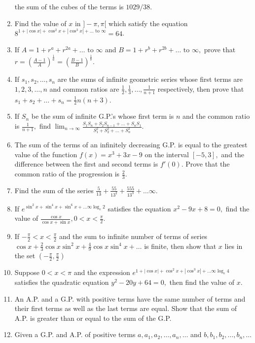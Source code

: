 \begin{enumerate}
  the sum of the cubes of the terms is $1029/38$.
\item Find the value of $x$ in $]-\pi, \pi[$ which satisfy the equation $8^{1 + |\cos x| + \cos^2 x + |\cos^3 x| + \ldots
      \text{~to~}\infty} = 64$.
\item If $A = 1 + r^a + r^{2a} + \ldots \text{~to~}\infty$ and $B = 1 + r^b + r^{2b} + \ldots \text{~to~}\infty,$ prove
  that $r = \left(\frac{A - 1}{A}\right)^{\frac{1}{a}} = \left(\frac{B - 1}{B}\right)^{\frac{1}{b}}$.
\item If $s_1, s_2, \ldots, s_n$ are the sums of infinite geometric series whose first terms are $1, 2, 3, \ldots, n$ and
  common ratios are $\frac{1}{2}, \frac{1}{3}, \ldots, \frac{1}{n + 1}$ respectively, then prove that $s_1 + s_2 + \ldots + s_n =
  \frac{1}{2}n(n + 3)$.
\item If $S_n$ be the sum of infinite G.P.'s whose first term is $n$ and the common ratio is $\frac{1}{n + 1},$ find
  $\displaystyle\lim_{n\to \infty} \frac{S_1S_n + S_2S_{n - 1} + \ldots + S_nS_1}{S_1^2 + S_2^2 + \ldots + S_n^2}$.
\item The sum of the terms of an infinitely decreasing G.P. is equal to the greatest value of the function $f(x) = x^3 +
  3x - 9$ on the interval $[-5, 3],$ and the difference between the first and second terms is $f'(0).$ Prove that the common ratio
  of the progression is $\frac{2}{3}$.
\item Find the sum of the series $\frac{5}{13} + \frac{55}{13^2} + \frac{555}{13^3} + \ldots \infty$.
\item If $e^{{\sin^2x + \sin^4x + \sin^6x + \ldots \infty}\log_e2}$ satisfies the equation $x^2 - 9x + 8 = 0,$ find the
  value of $\frac{\cos x}{\cos x + \sin x}, 0 < x < \frac{\pi}{2}$.
\item If $-\frac{\pi}{2} < x < \frac{\pi}{2}$ and the sum to infinite number of terms of series $\cos x + \frac{2}{3}\cos
  x\sin^2x + \frac{4}{9}\cos x\sin^4x + \ldots$ is finite, then show that $x$ lies in the set $\left(-\frac{\pi}{2},
  \frac{\pi}{2}\right)$
\item Suppose $0 < x < \pi$ and the expression $e^{{1 + |\cos x| + \cos^2x + |\cos^3x| + \ldots \infty}\log_e 4}$
  satisfies the quadratic equation $y^2 - 20y + 64 = 0,$ then find the value of $x$.
\item An A.P. and a G.P. with positive terms have the same number of terms and their first terms as well as the last
  terms are equal. Show that the sum of A.P. is greater than or equal to the sum of the G.P.
\item Given a G.P. and A.P. of positive terms $a, a_1, a_2, \ldots, a_n, \ldots$ and $b, b_1, b_2, \ldots, b_n, \ldots$

\end{enumerate}
